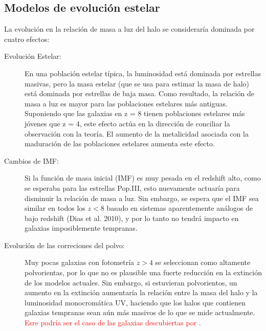 \documentclass{article}
\begin{document}
\subsection{Modelos de evolución estelar}
La evolución en la relación de masa a luz del halo se consideraría dominada por cuatro efectos:
\begin{description}
\item[Evolución Estelar:] En una población estelar típica, la luminosidad está dominada por estrellas masivas, pero la masa estelar (que se usa para estimar la masa de halo) está dominada por estrellas de baja masa. Como resultado, la relación de masa a luz es mayor para las poblaciones estelares más antiguas. Suponiendo que las galaxias en z = 8 tienen poblaciones estelares más jóvenes que z = 4, este efecto actúa en la dirección de conciliar la observación con la teoría. El aumento de la metalicidad asociada con la maduración de las poblaciones estelares aumenta este efecto.

\item[Cambios de IMF:] Si la función de masa inicial (IMF) es muy pesada en el redshift alto, como se esperaba para las estrellas Pop.III, esto nuevamente actuaría para disminuir la relación de masa a luz. Sin embargo, se espera que el IMF sea similar en todos los $z <8$ basado en sistemas aparentemente análogos de bajo redshift (Dias et al. 2010), y por lo tanto no tendrá impacto en galaxias imposiblemente tempranas.

\item[Evolución de las correciones del polvo:] Muy pocas galaxias con fotometría $z> 4$ se seleccionan como altamente polvorientas, por lo que no es plausible una fuerte reducción en la extinción de los modelos actuales. Sin embargo, si estuvieran polvorientos, un aumento en la extinción aumentaría la relación entre la masa del halo y la luminosidad monocromática UV, haciendo que los halos que contienen galaxias tempranas sean aún más masivos de lo que se mide actualmente. \textcolor{red}{Esre podría ser el caso de las galaxias descubiertas por \cite{wang2019dominant}}.


\end{description}
\end{document}
